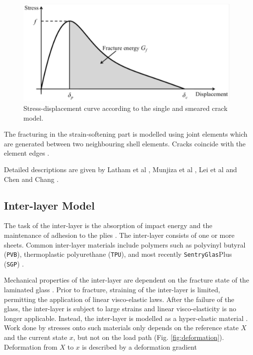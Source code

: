 \documentclass[format=acmtog,12pt,screen=true,review=false,natbib=false,]{acmart}
\begin{document}
\begin{figure}[!htbp]
    \centering
    \includegraphics[width=\columnwidth]{FractureEnergy}
    \caption{Stress-displacement curve according to the single and smeared crack model. \cite{Lat15}}
    \label{fig:FractureEnergy}
\end{figure}

The fracturing in the strain-softening part is modelled using joint elements which are generated between two neighbouring shell elements. Cracks coincide with the element edges \cite{Abu15}.

\bigbreak
Detailed descriptions are given by Latham et al \cite{Lat15}, Munjiza et al \cite{Mun04}, Lei et al \cite{Lei16} and Chen and Chang \cite{Che18}.

\subsection{Inter-layer Model}

The task of the inter-layer is the absorption of impact energy and the maintenance of adhesion to the plies \cite{Wu14}. The inter-layer consists of one or more sheets. Common inter-layer materials include polymers such as polyvinyl butyral (\texttt{PVB}), thermoplastic polyurethane (\texttt{TPU}), and most recently \texttt{SentryGlas}\textregistered Plus (\texttt{SGP}) \cite{Moh18, Wan18}. 

\bigbreak
Mechanical properties of the inter-layer are dependent on the fracture state of the laminated glass \cite{Kun15}. Prior to fracture, straining of the inter-layer is limited, permitting the application of linear visco-elastic laws. After the failure of the glass, the inter-layer is subject to large strains and linear visco-elasticity is no longer applicable. Instead, the inter-layer is modelled as a hyper-elastic material \cite{Gha15, Kim15}. Work done by stresses onto such materials only depends on the reference state $X$ and the current state $x$, but not on the load path (Fig. \ref{fig:deformation}). Deformation from $X$ to $x$ is described by a deformation gradient \cite{Gu07}
\end{document}
